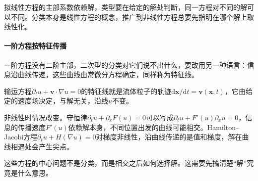 拟线性方程的主部系数依赖解，类型要在给定的解处判断，同一方程对不同的解可以不同。分类本身是线性方程的概念，推广到非线性方程总要先指明在哪个解上取线性化。

\paragraph{一阶方程按特征传播}
一阶方程没有二阶主部，二次型的分类对它们说不出什么，要改用另一种语言：信息沿曲线传递，这些曲线由常微分方程确定，同样称为特征线。

输运方程$\partial_tu+\bm{v}\cdot\nabla u=0$的特征线就是流体粒子的轨迹$\mathrm{d}\bm{x}/\mathrm{d}t=\bm{v}(\bm{x},t)$，它由给定的速度场决定，与解无关，沿线$u$不变。

非线性时情况改变。守恒律$\partial_tu+\partial_xF(u)=0$可以写成$\partial_tu+F'(u)\partial_xu=0$，信息的传播速度$F'(u)$依赖解本身，不同位置出发的曲线可能相交。Hamilton--Jacobi方程$\partial_tu+H(\nabla u)=0$对梯度非线性，沿曲线传递的是值和梯度，解在曲线相遇处会产生尖点。

这些方程的中心问题不是分类，而是相交之后如何选择解。这需要先搞清楚“解”究竟是什么意思。
